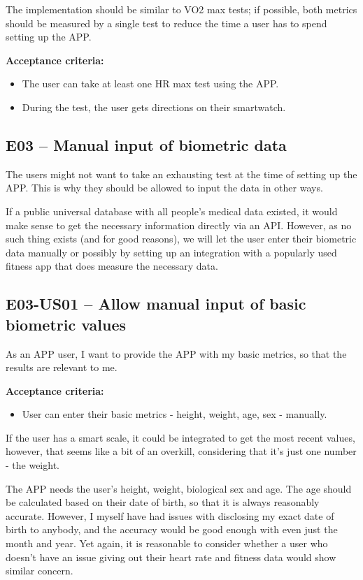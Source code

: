The implementation should be similar to VO2 max tests; if possible, both metrics should be measured by a single test to reduce the time a user has to spend setting up the APP.

\textbf{Acceptance criteria:}
\begin{itemize}
    \item The user can take at least one HR max test using the APP.
    \item During the test, the user gets directions on their smartwatch.
\end{itemize}

\subsection*{E03 -- Manual input of biometric data}
The users might not want to take an exhausting test at the time of setting up the APP.
This is why they should be allowed to input the data in other ways.

If a public universal database with all people's medical data existed, it would make sense to get the necessary information directly via an API.
However, as no such thing exists (and for good reasons), we will let the user enter their biometric data manually or possibly by setting up an integration with a popularly used fitness app that does measure the necessary data.

\subsection*{E03-US01 -- Allow manual input of basic biometric values}
As an APP user, I want to provide the APP with my basic metrics, so that the results are relevant to me.

\textbf{Acceptance criteria:}
\begin{itemize}
    \item User can enter their basic metrics - height, weight, age, sex - manually.
\end{itemize}

If the user has a smart scale, it could be integrated to get the most recent values, however, that seems like a bit of an overkill, considering that it's just one number - the weight.

The APP needs the user's height, weight, biological sex and age.
The age should be calculated based on their date of birth, so that it is always reasonably accurate.
However, I myself have had issues with disclosing my exact date of birth to anybody, and the accuracy would be good enough with even just the month and year.
Yet again, it is reasonable to consider whether a user who doesn't have an issue giving out their heart rate and fitness data would show similar concern.

